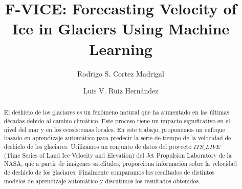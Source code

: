 \documentclass[sigconf,authordraft,language=spanish]{acmart}
\begin{document}
\title{F-VICE: Forecasting Velocity of Ice in Glaciers Using
  Machine Learning}

\author{Rodrigo S. Cortez Madrigal}
\authornotemark[1]

\author{Luis V. Ruiz Hernández}
\authornotemark[1]


\begin{abstract}
  El deshielo de los glaciares es un fenómeno natural
  que ha aumentado en las últimas décadas debido al cambio climático.
  Este proceso tiene un impacto significativo en el nivel del mar y en los ecosistemas locales.  
  En este trabajo, proponemos un enfoque basado en aprendizaje automático para predecir la serie de tiempo de la velocidad de deshielo de los glaciares. 
  Utilizamos un conjunto de datos del proyecto $ITS\_LIVE$ (Time Series of Land Ice Velocity and Elevation) del Jet Propulsion Laboratory de la NASA, que a partir de imágenes satelitales, proporciona información sobre la velocidad de deshielo de los glaciares.
  Finalmente comparamos los resultados de distintos modelos de aprendizaje automático y discutimos los resultados obtenidos.
\end{abstract}
\end{document}
